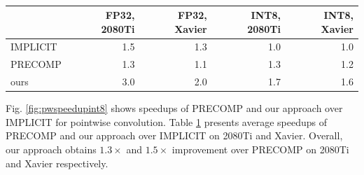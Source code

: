 \begin{table}[]
\setlength{\tabcolsep}{2.5pt}
\caption{}
\vspace{-3mm}
\label{tab:pwspeedups}
\centering
{}
\begin{threeparttable}
\begin{tabular}{l|r|r|r|r}
\toprule
& FP32, 2080Ti & FP32, Xavier &INT8, 2080Ti&INT8, Xavier\\
\midrule
IMPLICIT & 1.5 & 1.3 & 1.0 & 1.0\\
PRECOMP  & 1.3 & 1.1 & 1.3 & 1.2\\
ours     & 3.0 & 2.0 & 1.7 & 1.6\\
\bottomrule
\end{tabular}
\end{threeparttable}
\end{table}



  Fig. \ref{fig:pwspeedupint8} shows speedups of PRECOMP and our approach over IMPLICIT for
pointwise convolution. Table \ref{tab:pwspeedups} presents average speedups of PRECOMP and our approach over IMPLICIT on 2080Ti and Xavier. Overall, our approach obtains $1.3\times$ and $1.5\times$ improvement over PRECOMP on 2080Ti and Xavier respectively.


